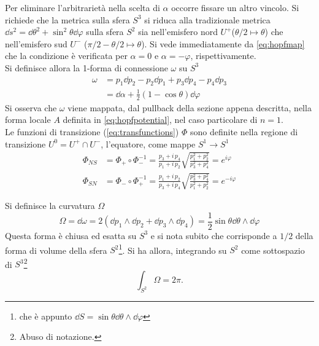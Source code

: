 Per eliminare l'arbitrarietà nella scelta di $\alpha$ occorre fissare un altro
vincolo.
Si richiede che la metrica sulla sfera $S^3$ si riduca alla tradizionale metrica
$\dd s^2 = \dd \theta^2 + \sin^2\theta \dd \varphi $ sulla sfera $S^2$ sia nell'emisfero
nord $U^+$($ \theta/2 \mapsto \theta $) che nell'emisfero sud $U^-$
($\pi /2 - \theta /2 \mapsto \theta $). Si vede immediatamente da \ref{eq:hopfmap} che la
condizione è verificata per $\alpha = 0$ e $\alpha = -\varphi $, rispettivamente.\\

Si definisce allora la 1-forma di connessione $\omega$ su $S^3$
\begin{equation}
   \begin{aligned}
      \omega & = p_1 \dd  p_2 - p_2 \dd  p_1 + p_3 \dd  p_4 - p_4 \dd  p_3 \\
             & = \dd \alpha + \frac{1}{2}(1 - \cos\theta) \dd  \varphi
   \end{aligned}
\end{equation}
Si osserva che $\omega$ viene mappata,
dal pullback della sezione appena descritta, nella forma locale $A$
definita in \ref{eq:hopfpotential}, nel caso particolare di $n = 1$.\\

Le funzioni di transizione (\ref{eq:transfunctions}) $\Phi$ sono definite nella regione di transizione
$U^0 = U^+ \cap U^-$, l'equatore, come mappe $S^1 \to S^1$
\begin{equation}
   \begin{aligned}
  \Phi_{NS} & = \Phi _+ \circ \Phi _- ^{-1}
             = \frac{p_3 +  i \, p_4}{p_1 + i \, p_2}
                \sqrt{ \frac{p_1^2 + p_2^2}{p_3^2 + p_4^2} }
             = e^{i\varphi } \\
  \Phi _{SN} & = \Phi _- \circ \Phi _+ ^{-1}
             = \frac{p_1 + i \, p_2}{p_3 +  i \, p_4}
                  \sqrt{ \frac{p_3^2 + p_4^2}{p_1^2 + p_2^2}}
             = e^{-i\varphi }
   \end{aligned}
\end{equation}

Si definisce la curvatura $\Omega$
$$
   \Omega = \dd  \omega = 2 ( \dd  p_1 \wedge \dd  p_2 + \dd  p_3 \wedge \dd  p_4)
          = \frac{1}{2} \sin\theta \dd \theta \wedge \dd \varphi
$$
Questa forma è chiusa ed esatta su $S^3$ e si nota subito che corrisponde a $1/2$
della forma di volume della sfera $S^2$\footnote{
   che è appunto $\dd S = \sin\theta \dd \theta \wedge \dd \varphi $}.
Si ha allora, integrando su $S^2$ come sottospazio di $S^3$\footnote{
   Abuso di notazione.}
$$
   \int_{S^2} \Omega = 2\pi.
$$

